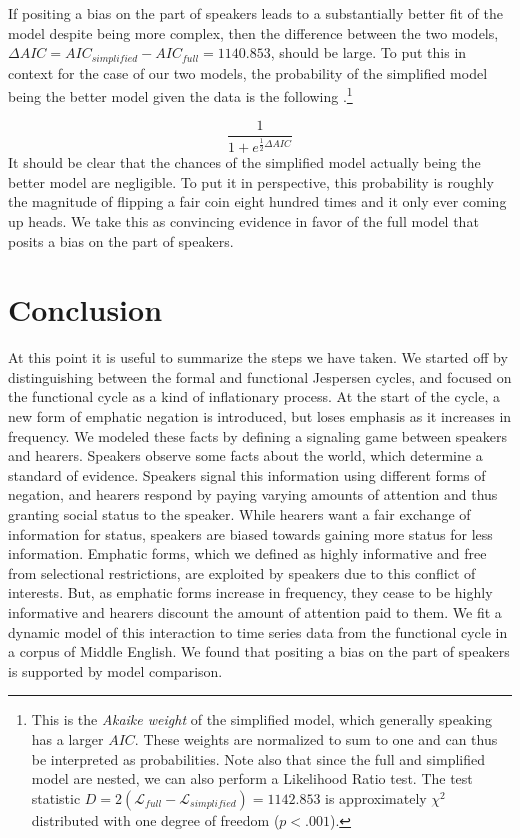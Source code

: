 \documentclass[linguex]{sp}
\theoremstyle{definition} \newtheorem{definition}{Definition}
\begin{document}
If positing a bias on the part of speakers leads to a substantially better fit of the model despite being more complex, then the difference between the two models,  $\Delta AIC = AIC_{simplified} - AIC_{full} = 1140.853$, should be large. To put this in context for the case of our two models, the probability of the simplified model being the better model given the data is the following \citep[74-79]{burnham2003}.\footnote{This is the \emph{Akaike weight} of the simplified model, which generally speaking has a larger $AIC$. These weights are normalized to sum to one and can thus be interpreted as probabilities. Note also that since the full and simplified model are nested, we can also perform a Likelihood Ratio test. The test statistic $D = 2(\mathcal{L}_{full} - \mathcal{L}_{simplified}) = 1142.853$ is approximately $\chi^2$ distributed with one degree of freedom ($p < .001$).}

\begin{equation}
	\frac{1}{1 + e^{\frac{1}{2}\Delta AIC}}
\end{equation}
It should be clear that the chances of the simplified model actually being the better model are negligible. To put it in perspective, this probability is roughly the magnitude of flipping a fair coin eight hundred times and it only ever coming up heads. We take this as convincing evidence in favor of the full model that posits a bias on the part of speakers.

\section{Conclusion}
\label{Conclusion}

At this point it is useful to summarize the steps we have taken. We started off by distinguishing between the formal and functional Jespersen cycles, and focused on the functional cycle as a kind of inflationary process. At the start of the cycle, a new form of emphatic negation is introduced, but loses emphasis as it increases in frequency. We modeled these facts by defining a signaling game between speakers and hearers. Speakers observe some facts about the world, which determine a standard of evidence. Speakers signal this information using different forms of negation, and hearers respond by paying varying amounts of attention and thus granting social status to the speaker. While hearers want a fair exchange of information for status, speakers are biased towards gaining more status for less information. Emphatic forms, which we defined as highly informative and free from selectional restrictions, are exploited by speakers due to this conflict of interests. But, as emphatic forms increase in frequency, they cease to be highly informative and hearers discount the amount of attention paid to them. We fit a dynamic model of this interaction to time series data from the functional cycle in a corpus of Middle English. We found that positing a bias on the part of speakers is supported by model comparison.
\end{document}
